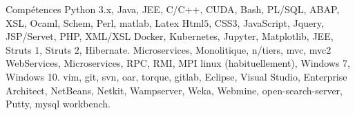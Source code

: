 \begin{rubric}{Compétences}
%
	Python $3$.x, Java, JEE, C/C++, CUDA, Bash, PL/SQL, ABAP, XSL, Ocaml, Schem, Perl, matlab, Latex 
%
	Html$5$, CSS$3$, JavaScript, Jquery, JSP/Servet, PHP, XML/XSL
%
	Docker, Kubernetes, Jupyter, Matplotlib, JEE, Struts $1$, Struts $2$, Hibernate.
%
	Microservices, Monolitique, n/tiers, mvc, mvc2
%
	WebServices, Microservices, RPC, RMI, MPI
\entry*[OS]%
    linux (habituellement), Windows 7, Windows 10. 
\entry*[Outils]%
    vim, git, svn, oar, torque, gitlab, Eclipse, Visual Studio, Enterprise Architect,
    NetBeans, Netkit, Wampserver, Weka, Webmine, open-search-server, Putty, mysql workbench.
\end{rubric}

